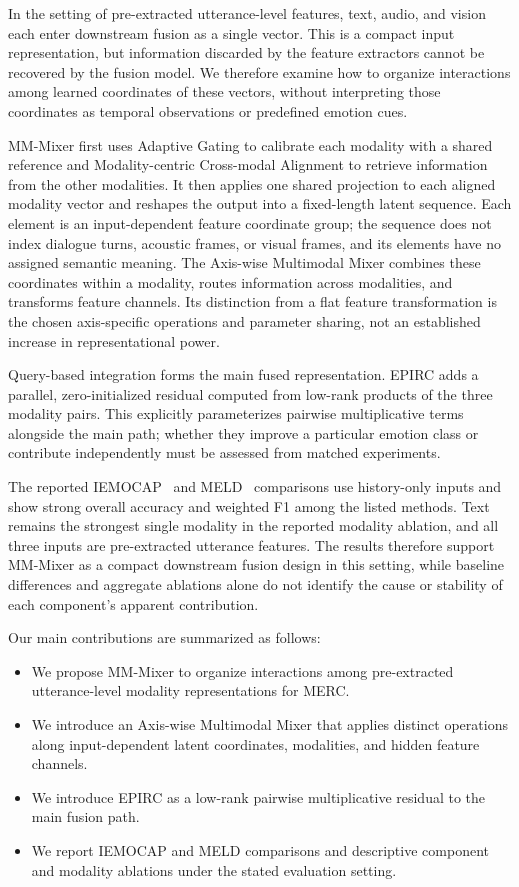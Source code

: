 \documentclass[letterpaper]{article} %
\begin{document}
In the setting of pre-extracted utterance-level features, text, audio, and vision each enter downstream fusion as a single vector. This is a compact input representation, but information discarded by the feature extractors cannot be recovered by the fusion model. We therefore examine how to organize interactions among learned coordinates of these vectors, without interpreting those coordinates as temporal observations or predefined emotion cues.

MM-Mixer first uses Adaptive Gating to calibrate each modality with a shared reference and Modality-centric Cross-modal Alignment to retrieve information from the other modalities. It then applies one shared projection to each aligned modality vector and reshapes the output into a fixed-length latent sequence. Each element is an input-dependent feature coordinate group; the sequence does not index dialogue turns, acoustic frames, or visual frames, and its elements have no assigned semantic meaning. The Axis-wise Multimodal Mixer combines these coordinates within a modality, routes information across modalities, and transforms feature channels. Its distinction from a flat feature transformation is the chosen axis-specific operations and parameter sharing, not an established increase in representational power.

Query-based integration forms the main fused representation. EPIRC adds a parallel, zero-initialized residual computed from low-rank products of the three modality pairs. This explicitly parameterizes pairwise multiplicative terms alongside the main path; whether they improve a particular emotion class or contribute independently must be assessed from matched experiments.

The reported IEMOCAP~\cite{iemocap} and MELD~\cite{meld} comparisons use history-only inputs and show strong overall accuracy and weighted F1 among the listed methods. Text remains the strongest single modality in the reported modality ablation, and all three inputs are pre-extracted utterance features. The results therefore support MM-Mixer as a compact downstream fusion design in this setting, while baseline differences and aggregate ablations alone do not identify the cause or stability of each component's apparent contribution.

Our main contributions are summarized as follows:
\begin{itemize}
\item We propose MM-Mixer to organize interactions among pre-extracted utterance-level modality representations for MERC.
\item We introduce an Axis-wise Multimodal Mixer that applies distinct operations along input-dependent latent coordinates, modalities, and hidden feature channels.
\item We introduce EPIRC as a low-rank pairwise multiplicative residual to the main fusion path.
\item We report IEMOCAP and MELD comparisons and descriptive component and modality ablations under the stated evaluation setting.
\end{itemize}
\end{document}
